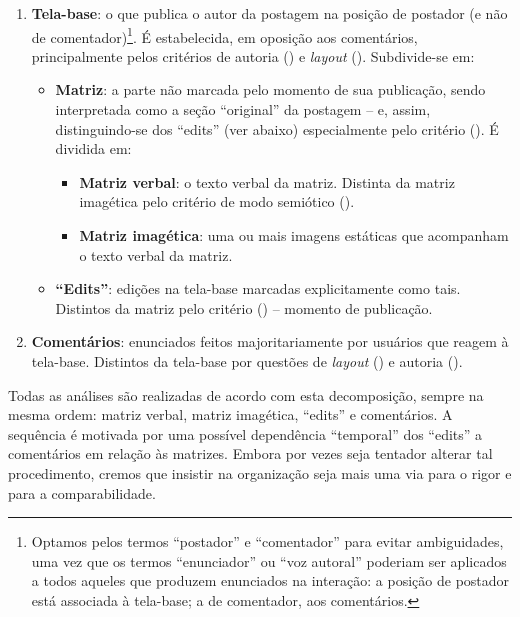 \documentclass{textolivre-html}
\begin{document}
\begin{enumerate}[label=\alph*.]
\item \textbf{Tela-base}: o que publica o autor da postagem na posição de postador (e não de comentador)\footnote{Optamos pelos termos “postador” e “comentador” para evitar ambiguidades, uma vez que os termos “enunciador” ou “voz autoral” poderiam ser aplicados a todos aqueles que produzem enunciados na interação: a posição de postador está associada à tela-base; a de comentador, aos comentários.}. É estabelecida, em oposição aos comentários, principalmente pelos critérios de autoria () e \textit{layout} (). Subdivide-se em:
    \begin{itemize}
    \item \textbf{Matriz}: a parte não marcada pelo momento de sua publicação, sendo interpretada como a seção “original” da postagem – e, assim, distinguindo-se dos “edits” (ver abaixo) especialmente pelo critério (). É dividida em:
    \begin{itemize}
        \item \textbf{Matriz verbal}: o texto verbal da matriz. Distinta da matriz imagética pelo critério de modo semiótico ().
        \item \textbf{Matriz imagética}: uma ou mais imagens estáticas que acompanham o texto verbal da matriz.
    \end{itemize}
    \item \textbf{“Edits”}: edições na tela-base marcadas explicitamente como tais. Distintos da matriz pelo critério () – momento de publicação.
    \end{itemize}
\item \textbf{Comentários}: enunciados feitos majoritariamente por usuários que reagem à tela-base. Distintos da tela-base por questões de \textit{layout} () e autoria ().
\end{enumerate}

Todas as análises são realizadas de acordo com esta decomposição, sempre na mesma ordem: matriz verbal, matriz imagética, “edits” e comentários. A sequência é motivada por uma possível dependência “temporal” dos “edits” a comentários em relação às matrizes. Embora por vezes seja tentador alterar tal procedimento, cremos que insistir na organização seja mais uma via para o rigor e para a comparabilidade.
\end{document}

